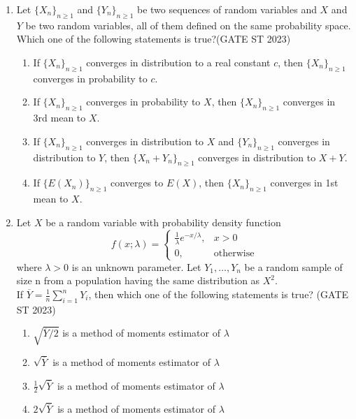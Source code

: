 \documentclass[journal]{IEEEtran}
\begin{document}
\begin{enumerate}[label=\textbf{Q.\arabic*.}, start=1, align=left, itemsep=2em]
\begin{enumerate}[label=\textbf{Q.\arabic*.}, start=11, align=left, itemsep=2em]
\item Let $\{X_n\}_{n \geq 1}$ and $\{Y_n\}_{n \geq 1}$ be two sequences of random variables and $X$ and $Y$ be two random variables, all of them defined on the same probability space. Which one of the following statements is true?\hfill(GATE ST 2023)

\begin{enumerate}[label=(\Alph*)]
    \item If $\{X_n\}_{n \geq 1}$ converges in distribution to a real constant $c$, then $\{X_n\}_{n \geq 1}$ converges in probability to $c$.
    
    \item If $\{X_n\}_{n \geq 1}$ converges in probability to $X$, then $\{X_n\}_{n \geq 1}$ converges in 3rd mean to $X$.
    
    \item If $\{X_n\}_{n \geq 1}$ converges in distribution to $X$ and $\{Y_n\}_{n \geq 1}$ converges in distribution to $Y$, then $\{X_n + Y_n\}_{n \geq 1}$ converges in distribution to $X + Y$.
    
    \item If $\{E(X_n)\}_{n \geq 1}$ converges to $E(X)$, then $\{X_n\}_{n \geq 1}$ converges in 1st mean to $X$.
\end{enumerate}

\item Let $X$ be a random variable with probability density function
\[ f(x;\lambda) = \begin{cases}
\frac{1}{\lambda} e^{-x/\lambda}, & x>0 \\
0, & \text{otherwise}
\end{cases} \]
where $\lambda > 0$ is an unknown parameter. Let $Y_1,\dots,Y_n$ be a random sample of size n from a population having the same distribution as $X^2$.\\
If $\overline{Y} = \frac1n \sum_{i=1}^n Y_i$, then which one of the following statements is true?  \hfill(GATE ST 2023)
\begin{enumerate}[label=(\Alph*)]
    \item $\sqrt{\overline{Y}/2}$ is a method of moments estimator of $\lambda$
    \item $\sqrt{\overline{Y}}$ is a method of moments estimator of $\lambda$
    \item $\frac{1}{2}\sqrt{\overline{Y}}$ is a method of moments estimator of $\lambda$
    \item $2\sqrt{\overline{Y}}$ is a method of moments estimator of $\lambda$
\end{enumerate}


\end{enumerate}
\end{enumerate}
\end{document}
